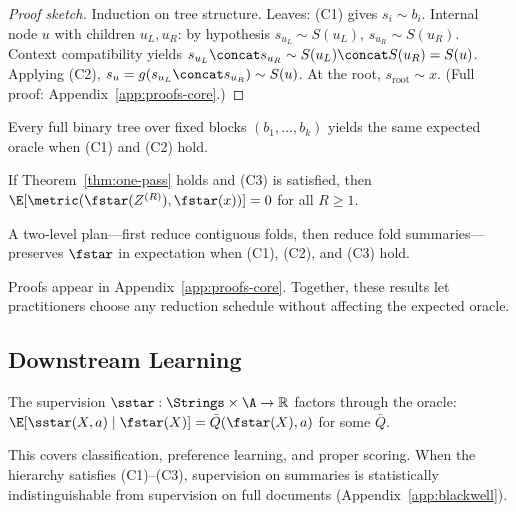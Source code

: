 \begin{proof}[Proof sketch]
Induction on tree structure. Leaves: (C1) gives $s_i \sim b_i$. Internal node $u$ with children $u_L, u_R$: by hypothesis $s_{u_L} \sim S(u_L)$, $s_{u_R} \sim S(u_R)$. Context compatibility yields $s_{u_L} \concat s_{u_R} \sim S(u_L) \concat S(u_R) = S(u)$. Applying (C2), $s_u = g(s_{u_L} \concat s_{u_R}) \sim S(u)$. At the root, $s_{\text{root}} \sim x$. \hfill (Full proof: Appendix~\ref{app:proofs-core}.)
\end{proof}

\begin{corollary}\label{cor:schedule}
Every full binary tree over fixed blocks $(b_1, \ldots, b_k)$ yields the same expected oracle when (C1) and (C2) hold.
\end{corollary}

\begin{theorem}\label{thm:multi-round}
If Theorem~\ref{thm:one-pass} holds and (C3) is satisfied, then $\E[\metric(\fstar(Z^{(R)}), \fstar(x))] = 0$ for all $R \geq 1$.
\end{theorem}

\begin{corollary}\label{cor:folds}
A two-level plan---first reduce contiguous folds, then reduce fold summaries---preserves $\fstar$ in expectation when (C1), (C2), and (C3) hold.
\end{corollary}

Proofs appear in Appendix~\ref{app:proofs-core}. Together, these results let practitioners choose any reduction schedule without affecting the expected oracle.

\subsection{Downstream Learning}\label{sec:exist-learn-transport}

\begin{assumption}\label{ass:CF}
The supervision $\sstar: \Strings \times \A \to \mathbb{R}$ factors through the oracle: $\E[\sstar(X, a) \mid \fstar(X)] = \bar{Q}(\fstar(X), a)$ for some $\bar{Q}$.
\end{assumption}

This covers classification, preference learning, and proper scoring. When the hierarchy satisfies (C1)--(C3), supervision on summaries is statistically indistinguishable from supervision on full documents (Appendix~\ref{app:blackwell}).

